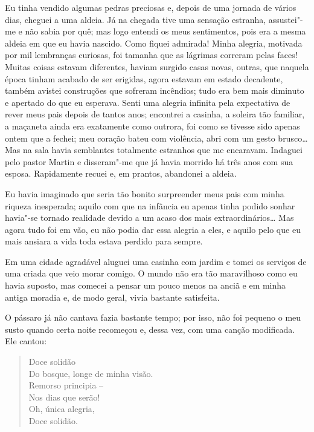  Eu tinha vendido algumas pedras preciosas e, depois de uma jornada de
vários dias, cheguei a uma aldeia. Já na chegada tive uma sensação
estranha, assustei"-me e não sabia por quê; mas logo entendi os meus
sentimentos, pois era a mesma aldeia em que eu havia nascido. Como fiquei
admirada! Minha alegria, motivada por mil lembranças curiosas, foi
tamanha que as lágrimas correram pelas faces! Muitas coisas estavam
diferentes, haviam surgido casas novas, outras, que naquela época
tinham acabado de ser erigidas, agora estavam em estado decadente,
também avistei construções que sofreram incêndios; tudo era bem mais
diminuto e apertado do que eu esperava. Senti uma alegria infinita pela
expectativa de rever meus pais depois de tantos anos; encontrei a
casinha, a soleira tão familiar, a maçaneta ainda era exatamente como
outrora, foi como se tivesse sido apenas ontem que a fechei; meu
coração bateu com violência, abri com um gesto brusco\ldots{} Mas na sala
havia semblantes totalmente estranhos que me encaravam. Indaguei pelo
pastor Martin e disseram"-me que já havia morrido há três anos com sua
esposa. Rapidamente recuei e, em prantos, abandonei a aldeia.

 Eu havia imaginado que seria tão bonito surpreender meus pais com minha
riqueza inesperada; aquilo com que na infância eu apenas tinha podido
sonhar havia"-se tornado realidade devido a um acaso dos mais
extraordinários\ldots{} Mas agora tudo foi em vão, eu não podia dar essa
alegria a eles, e aquilo pelo que eu mais ansiara a vida toda estava
perdido para sempre.

 Em uma cidade agradável aluguei uma casinha com jardim e tomei os
serviços de uma criada que veio morar comigo. O mundo não era tão
maravilhoso como eu havia suposto, mas comecei a pensar um pouco menos na
anciã e em minha antiga moradia e, de modo geral, vivia bastante
satisfeita.

 O pássaro já não cantava fazia bastante tempo; por isso, não foi
pequeno o meu susto quando certa noite recomeçou e, dessa vez, com uma
canção modificada. Ele cantou:

\begin{verse}
Doce solidão\\
Do bosque, longe de minha visão.\\
Remorso principia --\\
Nos dias que serão!\\
Oh, única alegria,\\
Doce solidão.
\end{verse}

